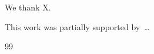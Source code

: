 \documentclass{article}
\numberwithin{equation}{section}
\begin{document}

\begin{abstract}
\ldots
\end{abstract}

\maketitle










\begin{ack}
We thank X.
\end{ack}

\begin{funding}
This work was partially supported by~\ldots
\end{funding}



\begin{thebibliography}{99}







\end{thebibliography}
\end{document}
